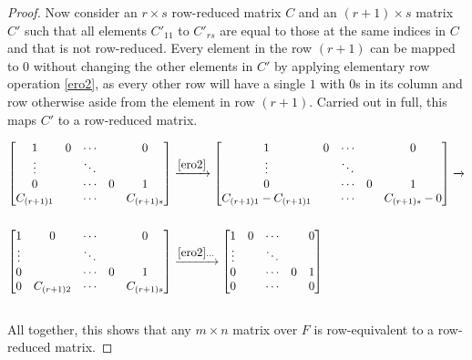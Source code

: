 \documentclass[12pt]{article}
\begin{document}
\begin{thm}
\begin{proof}
    Now consider an $r \times s$ row-reduced matrix $C$ and an
    $(r + 1) \times s$ matrix $C'$ such that all elements
    $C'_{11}$ to $C'_{rs}$ are equal to those at the same indices
    in $C$ and that is not row-reduced. Every element in the row
    $(r + 1)$ can be mapped to $0$ without changing the other
    elements in $C'$ by applying elementary row operation
    \eqref{ero2}, as every other row will have a single $1$ with
    $0$s in its column and row otherwise aside from the element
    in row $(r + 1)$. Carried out in full, this maps $C'$ to a
    row-reduced matrix.

    \begin{align*}
      \begin{bmatrix}
        1          & 0 & \cdots &   & 0\\
        \vdots     &   & \ddots &   &  \\
        0          &   & \cdots & 0 & 1\\
        C_{(r+1)1} &   & \cdots &   & C_{(r+1)s}
      \end{bmatrix}
      &\xrightarrow{\eqref{ero2}}
      \begin{bmatrix}
        1                       & 0 & \cdots &   & 0\\
        \vdots                  &   & \ddots &   &  \\
        0                       &   & \cdots & 0 & 1\\
        C_{(r+1)1} - C_{(r+1)1} &   & \cdots &   & C_{(r+1)s} - 0
      \end{bmatrix}
      \xrightarrow{}\\\\
      \begin{bmatrix}
        1      & 0 & \cdots &   & 0\\
        \vdots &   & \ddots &   &  \\
        0      &   & \cdots & 0 & 1\\
        0      & C_{(r+1)2} & \cdots &   & C_{(r+1)s}
      \end{bmatrix}
      &\xrightarrow{\eqref{ero2}\ldots}
      \begin{bmatrix}
        1      & 0 & \cdots &   & 0\\
        \vdots &   & \ddots &   &  \\
        0      &   & \cdots & 0 & 1\\
        0      &   & \cdots &   & 0
      \end{bmatrix}
    \end{align*}\\

    All together, this shows that any $m \times n$ matrix over
    $F$ is row-equivalent to a row-reduced matrix.
  \end{proof}
\end{thm}
\end{document}

